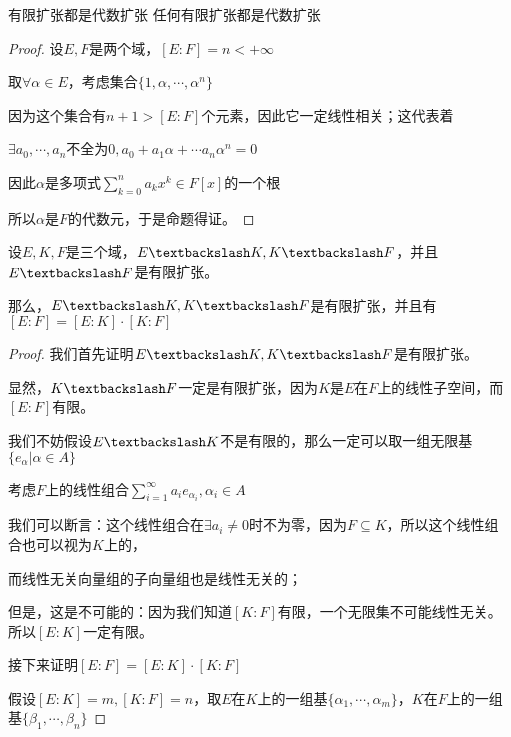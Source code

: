 \documentclass[12pt, a4paper, oneside, UTF8]{ctexbook}
\begin{document}
			\begin{para}{0}
					\begin{them}{有限扩张都是代数扩张}{}
						任何有限扩张都是代数扩张
					\end{them}
					\begin{proof}
						设$E,F$是两个域，$[E:F]=n < +\infty$

						取$\forall \alpha \in E$，考虑集合$\{1,\alpha ,\cdots,\alpha^n\}$

						因为这个集合有$n+1 > [E:F]$个元素，因此它一定线性相关；这代表着

						$\exists a_0,\cdots,a_n$不全为$0,a_0 + a_1\alpha + \cdots a_n \alpha ^n=0$

						因此$\alpha $是多项式$\sum\limits_{k=0}^{n} a_k x^k \in F[x]$的一个根

						所以$\alpha $是$F$的代数元，于是命题得证。
					\end{proof}
					\begin{proposition}
						设$E,K,F$是三个域，$E \textbackslash K,K\textbackslash F$，并且$E \textbackslash F$是有限扩张。

						那么，$E \textbackslash K,K\textbackslash F$是有限扩张，并且有$[E:F]=[E:K]\cdot [K:F]$
					\end{proposition}
					\begin{proof}
						我们首先证明$E \textbackslash K,K\textbackslash F$是有限扩张。

						显然，$K\textbackslash F$一定是有限扩张，因为$K$是$E$在$F$上的线性子空间，而$[E:F]$有限。

						我们不妨假设$E\textbackslash K$不是有限的，那么一定可以取一组无限基$\{e_\alpha | \alpha  \in A\}$

						考虑$F$上的线性组合$\sum\limits_{i=1}^{\infty} a_i e_{\alpha_i},\alpha_i \in A$

						我们可以断言：这个线性组合在$\exists a_i \neq 0$时不为零，因为$F \subseteq K$，所以这个线性组合也可以视为$K$上的，
						
						而线性无关向量组的子向量组也是线性无关的；

						但是，这是不可能的：因为我们知道$[K:F]$有限，一个无限集不可能线性无关。所以$[E:K]$一定有限。

						接下来证明$[E:F]=[E:K]\cdot [K:F]$

						假设$[E:K]=m,[K:F]=n$，取$E$在$K$上的一组基$\{\alpha_1,\cdots,\alpha_m\}$，$K$在$F$上的一组基$\{\beta_1,\cdots,\beta_n\}$


\end{proof}
\end{para}
\end{document}

